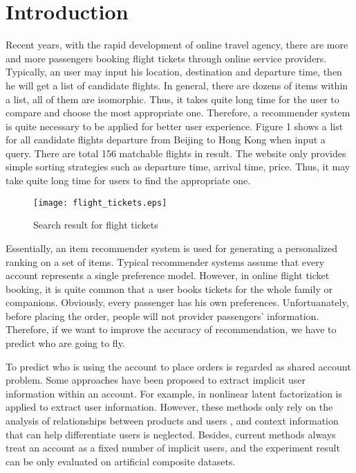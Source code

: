 \documentclass{sig-alternate-05-2015}
\begin{document}

\section{Introduction}
Recent years, with the rapid development of online travel agency, there are more and more passengers booking flight tickets through online service providers. Typically, an user may input his location, destination and departure time, then he will get a list of candidate flights. In general, there are dozens of items within a list, all of them are isomorphic. Thus, it takes quite long time for the user to compare and choose the most appropriate one. Therefore, a recommender system is quite necessary to be applied for better user experience. Figure 1 shows a list for all candidate flights departure from Beijing to Hong Kong when input a query. There are total 156 matchable flights in result. The website only provides simple sorting strategies such as departure time, arrival time, price. Thus, it may take quite long time for users to find the appropriate one.\par
\begin{figure}[!hbt]
\centering
\texttt{[image: flight\_tickets.eps]}
\caption{Search result for flight tickets}
\label{fig:Prob}
\end{figure}\par
Essentially, an item recommender system is used for generating a personalized ranking on a set of items\cite{lv:rec}. Typical recommender systems assume that every account represents a single preference model. However, in online flight ticket booking, it is quite common that a user books tickets for the whole family or companions.  Obviously, every passenger has his own preferences. Unfortuanately, before placing the order, people will not provider passengers' information.  Therefore, if we want to improve the accuracy of recommendation, we have to predict who are going to fly.  \par
To predict who is using the account to place orders is regarded as shared account problem. Some approaches have been proposed to extract implicit user information within an account. For example,  in \cite{kabbur:nlmf}\cite{jason:embedding} nonlinear latent factorization is applied to  extract user information. However, these methods only rely on the analysis of relationships between products and users \cite{koen:top-n}\cite{yutaka:modeling}, and context information that can help differentiate users is neglected. Besides, current methods always treat an account as a fixed number of implicit users, and the experiment result can be only evaluated on artificial composite datasets. 
\end{document}

